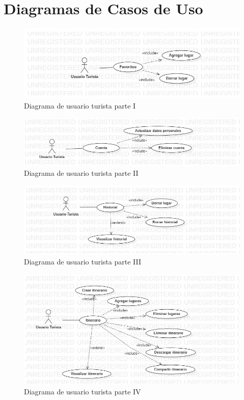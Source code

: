 \section{\textcolor{azul}{Diagramas de Casos de Uso}}
    \begin{figure}[htb]
        \centering
        \includegraphics[width= 15cm]{im1.jpg}
        \caption{Diagrama de usuario turista parte I}
        \label{fig:enter-label}
    \end{figure}
    \begin{figure}[htb]
        \centering
        \includegraphics[width= 15cm]{img3.jpg}
        \caption{Diagrama de usuario turista parte II}
        \label{fig:enter-label}
    \end{figure}
    \begin{figure}[htb]
        \centering
        \includegraphics[width= 15cm]{img4.jpg}
        \caption{Diagrama de usuario turista parte III}
        \label{fig:enter-label}
    \end{figure}
    \begin{figure}[htb]
        \centering
        \includegraphics[width= 15cm]{img8.jpg}
        \caption{Diagrama de usuario turista parte IV}
        \label{fig:enter-label}
    \end{figure}
